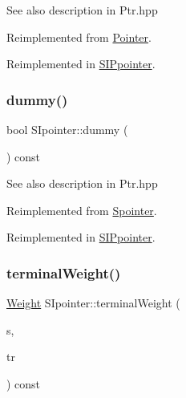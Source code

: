 \begin{DoxySeeAlso}{See also}
description in Ptr.\+hpp 
\end{DoxySeeAlso}


Reimplemented from \mbox{\hyperlink{classPointer_a7b636072b492b57efe3ead47e03a67bd}{Pointer}}.



Reimplemented in \mbox{\hyperlink{group__table_gabf87df773f8e0f628e0bae79e88097db}{S\+I\+Ppointer}}.

\mbox{\label{group__table_ga555753e41af94ac201a0c8c99babb83b}} 
\subsubsection{\texorpdfstring{dummy()}{dummy()}\hspace{0.1cm}{\footnotesize\ttfamily [1/2]}}
{\footnotesize\ttfamily bool S\+Ipointer\+::dummy (\begin{DoxyParamCaption}{ }\end{DoxyParamCaption}) const\hspace{0.3cm}{\ttfamily [virtual]}}

\begin{DoxySeeAlso}{See also}
description in Ptr.\+hpp 
\end{DoxySeeAlso}


Reimplemented from \mbox{\hyperlink{group__table_ga0a994ec6827ef23556b500382fc5a1fc}{Spointer}}.



Reimplemented in \mbox{\hyperlink{group__table_gaf830b0bf9d24b53e4674de49308b7853}{S\+I\+Ppointer}}.

\mbox{\label{group__table_ga6b46b59b3b465ba6a995f76ff34970ce}} 
\subsubsection{\texorpdfstring{terminalWeight()}{terminalWeight()}\hspace{0.1cm}{\footnotesize\ttfamily [1/2]}}
{\footnotesize\ttfamily \mbox{\hyperlink{classWeight}{Weight}} S\+Ipointer\+::terminal\+Weight (\begin{DoxyParamCaption}\item[{const \mbox{\hyperlink{classInputSegment}{Input\+Segment}} $\ast$}]{s,  }\item[{const \mbox{\hyperlink{classTransition}{Transition}} \&}]{tr }\end{DoxyParamCaption}) const\hspace{0.3cm}{\ttfamily [virtual]}}

